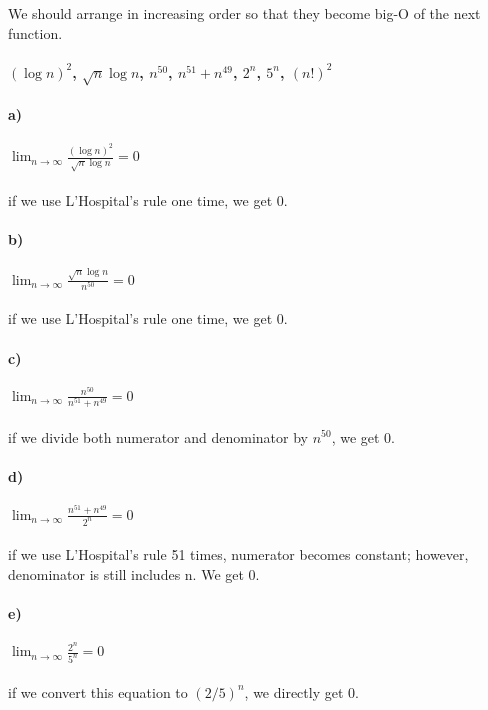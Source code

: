 \documentclass[12pt]{article}
\begin{document}
\noindent We should arrange in increasing order so that they become big-O of the next function. \\\\

\textbf{$(\log{n})^2$, $\sqrt{n}\log{n}$, $n^{50}$, $n^{51}+n^{49}$, $2^n$, $5^n$, $(n!)^2$}

\paragraph{a)} $\displaystyle{\lim_{n \to \infty}} \frac{(\log{n})^2}{\sqrt{n}\log{n}} = 0$\\\\ 
if we use L'Hospital's rule one time, we get 0.                                                                                                                                                 
\paragraph{b)} $\displaystyle{\lim_{n \to \infty}} \frac{\sqrt{n}\log{n}}{n^{50}} = 0$\\\\  
if we use L'Hospital's rule one time, we get 0.                                                                                                                                              
\paragraph{c)} $\displaystyle{\lim_{n \to \infty}} \frac{n^{50}}{n^{51} + n^{49}} = 0$\\\\ 
if we divide both numerator and denominator by $n^{50}$, we get 0.
\paragraph{d)} $\displaystyle{\lim_{n \to \infty}} \frac{n^{51} + n^{49}}{2^n} = 0$\\\\ 
if we use L'Hospital's rule 51 times, numerator becomes constant; however, denominator is still includes n. We get 0.
\paragraph{e)} $\displaystyle{\lim_{n \to \infty}} \frac{2^n}{5^n} = 0$\\\\
if we convert this equation to $(2/5)^n$, we directly get 0.
\end{document}
